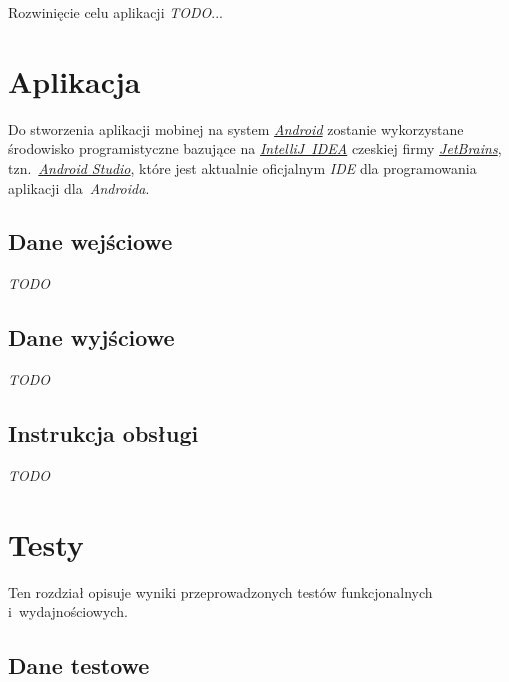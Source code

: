 \documentclass[a4paper,titlepage]{article}
\theoremstyle{break}
\begin{document}
Rozwinięcie celu aplikacji \emph{TODO}...


\section{Aplikacja}

Do stworzenia aplikacji mobinej na system \emph{\href{http://www.android.com/}{Android}} zostanie wykorzystane środowisko programistyczne bazujące na \emph{\href{https://www.jetbrains.com/idea/}{IntelliJ~IDEA}} czeskiej firmy \emph{\href{https://www.jetbrains.com/}{JetBrains}}, tzn.~\emph{\href{http://developer.android.com/tools/studio/index.html}{Android Studio}}, które jest aktualnie oficjalnym \emph{IDE} dla programowania aplikacji dla~\emph{Androida}.

\subsection{Dane wejściowe}

\emph{TODO}


\subsection{Dane wyjściowe}

\emph{TODO}


\subsection{Instrukcja obsługi}

\emph{TODO}


\section{Testy}

Ten rozdział opisuje wyniki przeprowadzonych testów funkcjonalnych i~wydajnościowych.

\subsection{Dane testowe}
\end{document}
